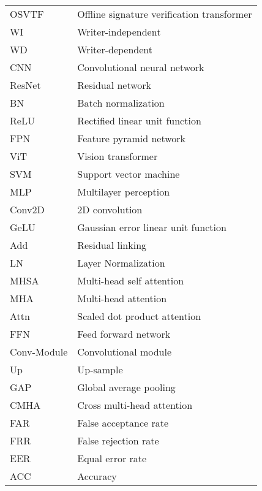 \begin{tabular}{@{} l @{\hspace{3em}} l @{}}
    OSVTF & Offline signature verification transformer \\
    WI & Writer-independent \\
    WD & Writer-dependent \\
    CNN & Convolutional neural network \\
    ResNet & Residual network \\
    BN & Batch normalization \\
    ReLU & Rectified linear unit function \\
    FPN & Feature pyramid network \\
    ViT & Vision transformer \\
    SVM & Support vector machine \\
    MLP & Multilayer perception \\
    Conv2D & 2D convolution \\
    GeLU & Gaussian error linear unit function \\
    Add & Residual linking \\
    LN & Layer Normalization \\
    MHSA & Multi-head self attention \\
    MHA & Multi-head attention \\
    Attn & Scaled dot product attention \\
    FFN & Feed forward network \\
    Conv-Module & Convolutional module \\
    Up & Up-sample \\
    GAP & Global average pooling \\
    CMHA & Cross multi-head attention \\
    FAR & False acceptance rate \\
    FRR & False rejection rate \\
    EER & Equal error rate \\
    ACC & Accuracy \\
\end{tabular}

